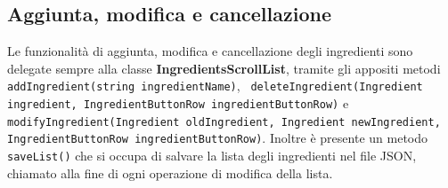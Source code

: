 \subsection{Aggiunta, modifica e cancellazione}
Le funzionalità di aggiunta, modifica e cancellazione degli ingredienti sono delegate sempre alla classe \textbf{IngredientsScrollList}, tramite gli appositi metodi \texttt{addIngredient(string ingredientName)}, \texttt{ deleteIngredient(Ingredient ingredient, IngredientButtonRow ingredientButtonRow)} e \\ \texttt{modifyIngredient(Ingredient oldIngredient, Ingredient newIngredient, \\ IngredientButtonRow ingredientButtonRow)}. Inoltre è presente un metodo \texttt{saveList()} che si occupa di salvare la lista degli ingredienti nel file JSON, chiamato alla fine di ogni operazione di modifica della lista.

